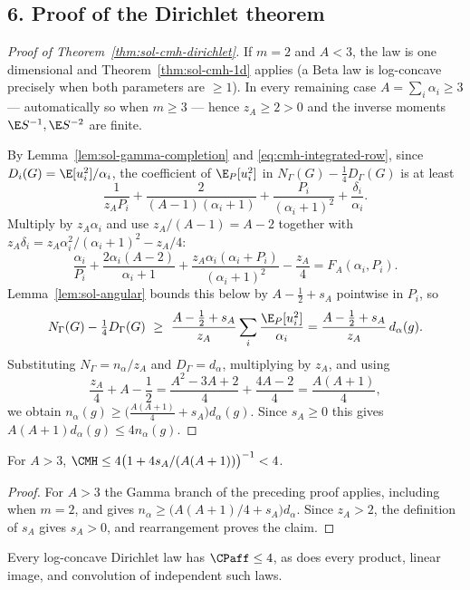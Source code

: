 \documentclass[../main.tex]{subfiles}
\begin{document}
\subsection*{6. Proof of the Dirichlet theorem}

\begin{proof}[Proof of Theorem~\ref{thm:sol-cmh-dirichlet}]
If $m=2$ and $A<3$, the law is one dimensional and Theorem~\ref{thm:sol-cmh-1d} applies (a
$\mathrm{Beta}$ law is log-concave precisely when both parameters are $\ge1$). In every
remaining case $A=\sum_i\alpha_i\ge3$ --- automatically so when $m\ge3$ --- hence $z_A\ge2>0$
and the inverse moments $\E S^{-1},\E S^{-2}$ are finite.

By Lemma~\ref{lem:sol-gamma-completion} and \eqref{eq:cmh-integrated-row}, since
$D_i(G)=\E[u_i^2]/\alpha_i$, the coefficient of $\E_P[u_i^2]$ in
$N_\Gamma(G)-\tfrac14D_\Gamma(G)$ is at least
\[
  \frac1{z_AP_i}+\frac2{(A-1)(\alpha_i+1)}+\frac{P_i}{(\alpha_i+1)^2}+\frac{\delta_i}{\alpha_i}.
\]
Multiply by $z_A\alpha_i$ and use $z_A/(A-1)=A-2$ together with
$z_A\delta_i=z_A\alpha_i^2/(\alpha_i+1)^2-z_A/4$:
\[
  \frac{\alpha_i}{P_i}+\frac{2\alpha_i(A-2)}{\alpha_i+1}
  +\frac{z_A\alpha_i(\alpha_i+P_i)}{(\alpha_i+1)^2}-\frac{z_A}4
  =F_A(\alpha_i,P_i).
\]
Lemma~\ref{lem:sol-angular} bounds this below by $A-\tfrac12+s_A$ pointwise in $P_i$, so
\[
  N_\Gamma(G)-\tfrac14D_\Gamma(G)
  \ \ge\ \frac{A-\tfrac12+s_A}{z_A}\sum_i\frac{\E_P[u_i^2]}{\alpha_i}
  =\frac{A-\tfrac12+s_A}{z_A}\,d_\alpha(g).
\]
Substituting $N_\Gamma=n_\alpha/z_A$ and $D_\Gamma=d_\alpha$, multiplying by $z_A$, and using
\[
  \frac{z_A}4+A-\frac12=\frac{A^2-3A+2}4+\frac{4A-2}4=\frac{A(A+1)}4,
\]
we obtain $n_\alpha(g)\ge\bigl(\tfrac{A(A+1)}4+s_A\bigr)d_\alpha(g)$. Since $s_A\ge0$ this gives
$A(A+1)d_\alpha(g)\le4n_\alpha(g)$.
\end{proof}

\begin{corollary}[= Corollary~\ref{cor:cmh-dirichlet-surplus}]
For $A>3$, $\CMH\le4\bigl(1+4s_A/(A(A+1))\bigr)^{-1}<4$.
\end{corollary}

\begin{proof}
For $A>3$ the Gamma branch of the preceding proof applies, including when $m=2$, and gives
$n_\alpha\ge\bigl(A(A+1)/4+s_A\bigr)d_\alpha$. Since $z_A>2$, the definition of $s_A$ gives
$s_A>0$, and rearrangement proves the claim.
\end{proof}

\begin{corollary}[= Corollary~\ref{cor:cmh-dirichlet-poincare}]
Every log-concave Dirichlet law has $\CPaff\le4$, as does every product, linear image, and
convolution of independent such laws.
\end{corollary}
\end{document}
